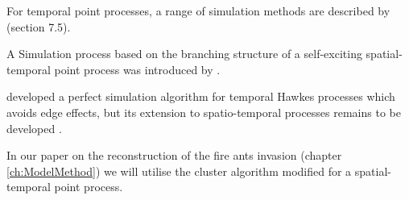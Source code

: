 \documentclass[11pt,a4paper]{article}
\begin{document}
For temporal point processes, a range of simulation methods are described by \cite{Daley} (section 7.5).

A Simulation process based on the branching structure of a self-exciting spatial-temporal point process was introduced by \cite{Zhuang}. 

\cite{Moller} developed a perfect simulation algorithm for temporal Hawkes processes which avoids edge effects, but its extension to spatio-temporal processes remains to be developed \cite{Reinhart}.

In our paper on the reconstruction of the fire ants invasion (chapter \ref{ch:ModelMethod}) we will utilise the cluster algorithm modified for a spatial-temporal point process.
\end{document}
